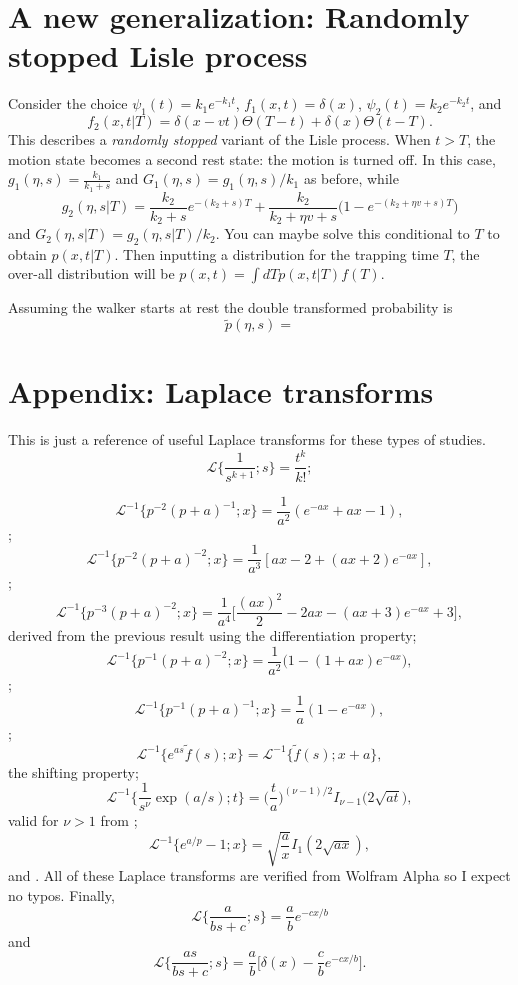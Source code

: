 \documentclass[11pt]{article}
\newcommand\be{\begin{equation}} %
\newcommand\ee{\end{equation}}   %
\newcommand\El{\mathcal{L}}
\begin{document}
\section{A new generalization: Randomly stopped Lisle process}

Consider the choice $\psi_1(t) = k_1e^{-k_1t}$, $f_1(x,t)=\delta(x)$, $\psi_2(t) = k_2e^{-k_2t}$, and 
\be f_2(x,t|T) = \delta(x-vt)\Theta(T-t) + \delta(x)\Theta(t-T).\ee
This describes a \textit{randomly stopped} variant of the Lisle process.
When $t>T$, the motion state becomes a second rest state: the motion is turned off.
In this case, $g_1(\eta,s) = \frac{k_1}{k_1+s}$ and $G_1(\eta,s) = g_1(\eta,s)/k_1$ as before, while
\be g_2(\eta,s|T) = \frac{k_2}{k_2+s}e^{-(k_2+s)T} + \frac{k_2}{k_2 + \eta v + s}\Big(1-e^{-(k_2 + \eta v + s)T}\Big)\ee
and $G_2(\eta,s|T) = g_2(\eta,s|T)/k_2$.
You can maybe solve this conditional to $T$ to obtain $p(x,t|T)$.
Then inputting a distribution for the trapping time $T$, the over-all distribution will be $p(x,t) = \int dT p(x,t|T)f(T)$.

Assuming the walker starts at rest the double transformed probability is
\be \tilde{p}(\eta,s) = \ee


\section*{Appendix: Laplace transforms}
This is just a reference of useful Laplace transforms for these types of studies.
\be \El\Big\{\frac{1}{s^{k+1}};s\Big\} = \frac{t^k}{k!};\ee

\be \El^{-1}\Big\{p^{-2}(p+a)^{-1};x\Big\} = \frac{1}{a^2}(e^{-ax}+ax-1),\ee
\citep[][2.1.2.33]{Prudnikov1986};
\be \El^{-1}\Big\{p^{-2}(p+a)^{-2};x\Big\} = \frac{1}{a^3}[ax - 2 + (ax+2)e^{-ax}],\ee
\citep[][2.1.2.49]{Prudnikov1986};
\be \El^{-1}\Big\{p^{-3}(p+a)^{-2};x\Big\} = \frac{1}{a^4}\Big[\frac{(ax)^2}{2} - 2ax - (ax+3)e^{-ax} + 3\Big], \ee
derived from the previous result using the differentiation property;
\be \El^{-1}\Big\{p^{-1}(p+a)^{-2};x\Big\} = \frac{1}{a^2}\Big(1 -(1+ax)e^{-ax}\Big),\ee
\citep[][2.1.2.47]{Prudnikov1986};
\be \El^{-1}\Big\{p^{-1}(p+a)^{-1};x\Big\} = \frac{1}{a}(1-e^{-ax}),\ee
\citep[][2.1.2.31]{Prudnikov1986};
\be\El^{-1} \{e^{as}\tilde{f}(s);x\} = \El^{-1}\{\tilde{f}(s);x+a\},\ee
the shifting property;
\be \El^{-1}\big\{\frac{1}{s^\nu}\exp(a/s);t\} = \Big(\frac{t}{a}\Big)^{(\nu-1)/2}I_{\nu-1}\big(2\sqrt{a t}\big), \ee
valid for $\nu>1$ from \citep[][2.2.2.1]{Prudnikov1986};
\be \El^{-1}\{e^{a/p}-1;x\} = \sqrt{\frac{a}{x}}I_1(2\sqrt{ax}),\ee
and \citep[][2.2.2.8]{Prudnikov1986}.
All of these Laplace transforms are verified from Wolfram Alpha so I expect no typos.
Finally,
\be \El\Big\{\frac{a}{bs+c};s\Big\} = \frac{a}{b}e^{-cx/b}\ee
and
\be \El\Big\{\frac{as}{bs+c};s\Big\} = \frac{a}{b}\Big[\delta(x) - \frac{c}{b}e^{-cx/b}\Big].\ee
\end{document}
